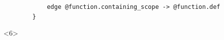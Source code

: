 \documentclass[aspectratio=169]{beamer}
\begin{document}
\begin{frame}[fragile]
\begin{center}
\begin{minipage}{0.75\textwidth}
\begin{minipage}{15em}
\begin{uncoverenv}
\begin{verbatim}
            edge @function.containing_scope -> @function.def
        }
    \end{verbatim}
    \end{uncoverenv}
    \begin{uncoverenv}<6>
    \begin{center}
    \end{center}
    \end{uncoverenv}
    \end{minipage}

    \end{minipage}
    \end{center}
\end{frame}
\end{document}
